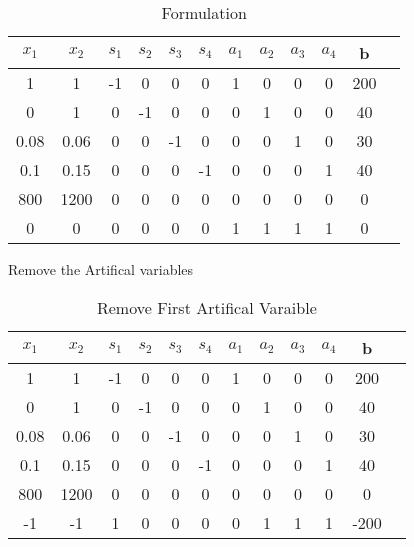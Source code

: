 \documentclass{article}
\begin{document}
  \begin{table}[H]
  \centering
  \caption{Formulation}
  \label{my-label}
  \begin{tabular}{|c|c|c|c|c|c|c|c|c|c|c|c|}
  \hline
  $x_1$ & $x_2$ & $s_1$  & $s_2$ & $s_3$ & $s_4$ & $a_1$ & $a_2$ & $a_3$ & $a_4$ & b  \\ \hline
  1    & 1    & -1       & 0    & 0    & 0    & 1    & 0    & 0    & 0 & 200 \\ \hline
  0    & 1    & 0        & -1   & 0    & 0    & 0    & 1    & 0    & 0 & 40  \\ \hline
  0.08 & 0.06 & 0        & 0    & -1   & 0    & 0    & 0    & 1    & 0 & 30  \\ \hline
  0.1  & 0.15 & 0        & 0    & 0    & -1   & 0    & 0    & 0    & 1 & 40  \\ \hline
  800  & 1200 & 0        & 0    & 0    & 0    & 0    & 0    & 0    & 0 & 0   \\ \hline
  0    & 0    & 0        & 0    & 0    & 0    & 1    & 1    & 1    & 1 & 0   \\ \hline
  \end{tabular}
  \end{table}
 
 Remove the Artifical variables

  \begin{table}[H]
  \centering
  \caption{Remove First Artifical Varaible}
  \label{my-label}
  \begin{tabular}{|c|c|c|c|c|c|c|c|c|c|c|c|}
  \hline
  $x_1$ & $x_2$ & $s_1$  & $s_2$ & $s_3$ & $s_4$ & $a_1$ & $a_2$ & $a_3$ & $a_4$ & b  \\ \hline
  1    & 1    & -1       & 0    & 0    & 0    & 1    & 0    & 0    & 0 & 200 \\ \hline
  0    & 1    & 0        & -1   & 0    & 0    & 0    & 1    & 0    & 0 & 40  \\ \hline
  0.08 & 0.06 & 0        & 0    & -1   & 0    & 0    & 0    & 1    & 0 & 30  \\ \hline
  0.1  & 0.15 & 0        & 0    & 0    & -1   & 0    & 0    & 0    & 1 & 40  \\ \hline
  800  & 1200 & 0        & 0    & 0    & 0    & 0    & 0    & 0    & 0 & 0   \\ \hline
  -1   & -1   & 1        & 0    & 0    & 0    & 0    & 1    & 1    & 1 & -200    \\ \hline
  \end{tabular}
  \end{table}
\end{document}
